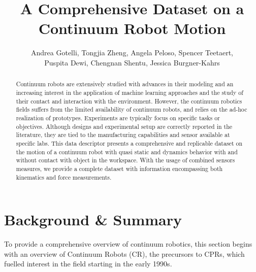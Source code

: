\documentclass[14pt, a4paper]{article}
\title{A Comprehensive Dataset on a Continuum Robot Motion}
\author{Andrea Gotelli, Tongjia Zheng, Angela Peloso, Spencer Teetaert, \\Puspita Dewi, Chengnan Shentu, Jessica Burgner-Kahrs}
\begin{document}
\maketitle


\begin{abstract}
    Continuum robots are extensively studied with advances in their modeling and an increasing interest in the application of machine learning approaches and the study of their contact and interaction with the environment. 
    However, the continuum robotics fields suffers from the limited availability of continuum robots, and relies on the ad-hoc realization of prototypes.
    Experiments are typically focus on specific tasks or objectives. 
    Although designs and experimental setup are correctly reported in the literature, they are tied to the manufacturing capabilities and sensor available at specific labs. 
    This data descriptor presents a comprehensive and replicable dataset on the motion of a continuum robot with quasi static and dynamics behavior with and without contact with object in the workspace. 
    With the usage of combined sensors measures, we provide a complete dataset with information encompassing both kinematics and force measurements.
\end{abstract}


\section{Background \& Summary}



To provide a comprehensive overview of continuum robotics, this section begins with an overview of Continuum Robots (CR), the precursors to CPRs, which fuelled interest in the field starting in the early 1990s.
\end{document}
